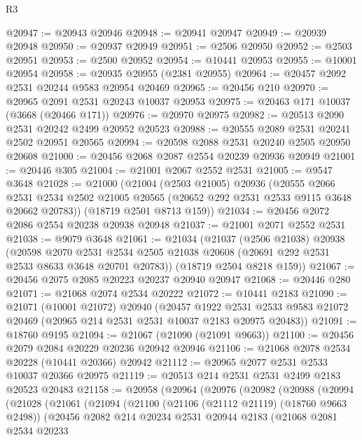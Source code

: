 \begin{lexlean}{R3}
\begin{coremodule}
@20947 := @20943 @20946
@20948 := @20941 @20947
@20949 := @20939 @20948
@20950 := @20937 @20949
@20951 := @2506 @20950
@20952 := @2503 @20951
@20953 := @2500 @20952
@20954 := @10441 @20953
@20955 := @10001 @20954
@20958 := @20935 @20955 (@2381 @20955)
@20964 := @20457 @2092 @2531 @20244 @9583 @20954 @20469
@20965 := @20456 @210
@20970 := @20965 @2091 @2531 @20243 @10037 @20953
@20975 := @20463 @171 @10037 (@3668 (@20466 @171))
@20976 := @20970 @20975
@20982 := @20513 @2090 @2531 @20242 @2499 @20952 @20523
@20988 := @20555 @2089 @2531 @20241 @2502 @20951 @20565
@20994 := @20598 @2088 @2531 @20240 @2505 @20950 @20608
@21000 := @20456 @2068 @2087 @2554 @20239 @20936 @20949
@21001 := @20446 @305
@21004 := @21001 @2067 @2552 @2531
@21005 := @9547 @3648
@21028 := @21000
    (@21004
      (@2503 @21005)
      @20936
      (@20555
        @2066
        @2531
        @2534
        @2502
        @21005
        @20565
        (@20652 @292 @2531 @2533 @9115 @3648 @20662 @20783))
      (@18719 @2501 @8713 @159))
@21034 := @20456 @2072 @2086 @2554 @20238 @20938 @20948
@21037 := @21001 @2071 @2552 @2531
@21038 := @9079 @3648
@21061 := @21034
    (@21037
      (@2506 @21038)
      @20938
      (@20598
        @2070
        @2531
        @2534
        @2505
        @21038
        @20608
        (@20691 @292 @2531 @2533 @8633 @3648 @20701 @20783))
      (@18719 @2504 @8218 @159))
@21067 := @20456 @2075 @2085 @20223 @20237 @20940 @20947
@21068 := @20446 @280
@21071 := @21068 @2074 @2534 @20222
@21072 := @10441 @2183
@21090 := @21071
    (@10001 @21072)
    @20940
    (@20457
      @1922
      @2531
      @2533
      @9583
      @21072
      @20469
      (@20965 @214 @2531 @2531 @10037 @2183 @20975 @20483))
@21091 := @18760 @9195
@21094 := @21067 (@21090 (@21091 @9663))
@21100 := @20456 @2079 @2084 @20229 @20236 @20942 @20946
@21106 := @21068 @2078 @2534 @20228 (@10441 @20366) @20942
@21112 := @20965 @2077 @2531 @2533 @10037 @20366 @20975
@21119 := @20513 @214 @2531 @2531 @2499 @2183 @20523 @20483
@21158 := @20958
    (@20964
      (@20976
        (@20982
          (@20988
            (@20994
              (@21028
                (@21061
                  (@21094
                    (@21100
                      (@21106 (@21112 @21119) (@18760 @9663 @2498))
                      (@20456
                        @2082
                        @214
                        @20234
                        @2531
                        @20944
                        @2183
                        (@21068
                          @2081
                          @2534
                          @20233

\end{coremodule}
\end{lexlean}
